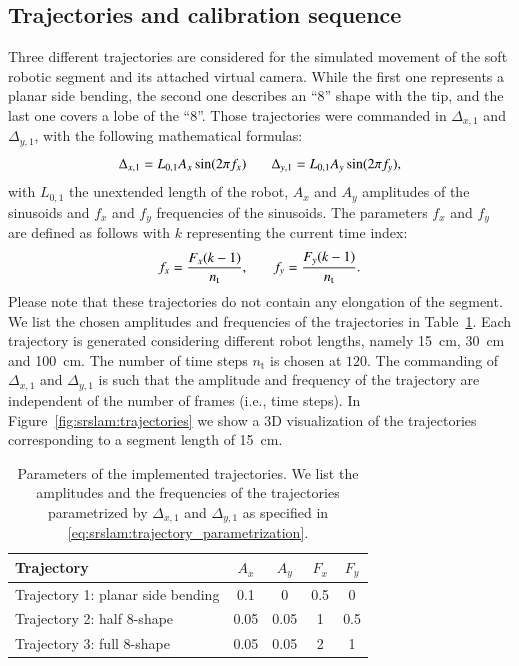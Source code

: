 \subsection{Trajectories and calibration sequence}\label{sub:srslam:trajectories}
Three different trajectories are considered for the simulated movement of the soft robotic segment and its attached virtual camera. While the first one represents a planar side bending, the second one describes an “8” shape with the tip, and the last one covers a lobe of the “8”. 
Those trajectories were commanded in $\Delta_{x,1}$ and $\Delta_{y,1}$, with the following mathematical formulas:
\begin{equation}\small\label{eq:srslam:trajectory_parametrization}
    \Delta_{x,1} = L_{0,1} A_x \sin(2 \pi f_x) \qquad \Delta_{y,1} = L_{0,1} A_y \sin(2 \pi f_y),
\end{equation}
with $L_{0,1}$ the unextended length of the robot, $A_x$ and $A_y$ amplitudes of the sinusoids and $f_x$ and $f_y$ frequencies of the sinusoids.
The parameters $f_x$ and $f_y$ are defined as follows with $k$ representing the current time index:
\begin{equation}\small
    f_x = \frac{F_x (k-1)}{n_{\mathrm{t}}}, \qquad f_y = \frac{F_y (k-1)}{n_{\mathrm{t}}}.
\end{equation}
Please note that these trajectories do not contain any elongation of the segment. 
We list the chosen amplitudes and frequencies of the trajectories in Table~\ref{tab:srslam:trajectory_params}. Each trajectory is generated considering different robot lengths, namely \SI{15}{cm}, \SI{30}{cm} and \SI{100}{cm}. The number of time steps $n_{\mathrm{t}}$ is chosen at $120$. 
The commanding of $\Delta_{x,1}$ and $\Delta_{y,1}$ is such that the amplitude and frequency of the trajectory are independent of the number of frames (i.e., time steps).
In Figure~\ref{fig:srslam:trajectories} we show a 3D visualization of the trajectories corresponding to a segment length of \SI{15}{cm}.

\begin{table}
\centering
\caption{Parameters of the implemented trajectories. We list the amplitudes and the frequencies of the trajectories parametrized by $\Delta_{x,1}$ and $\Delta_{y,1}$ as specified in \eqref{eq:srslam:trajectory_parametrization}.}
\begin{tabular}{lcccc}\toprule
\textbf{Trajectory} & $A_x$ & $A_y$ & $F_x$ & $F_y$\\
\midrule
Trajectory 1: planar side bending & 0.1 & 0 & 0.5 & 0\\
Trajectory 2: half 8-shape & 0.05 & 0.05 & 1 & 0.5\\
Trajectory 3: full 8-shape & 0.05 & 0.05 & 2 & 1\\
\bottomrule
\end{tabular}
\label{tab:srslam:trajectory_params}
\end{table}

